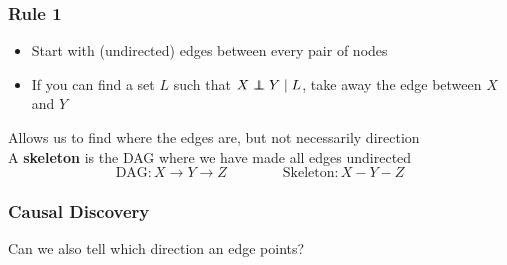 \documentclass{beamer}
\def\independenT#1#2{\mathrel{\rlap{$#1#2$}\mkern2mu{#1#2}}}
\newcommand\indep{\protect\mathpalette{\protect\independenT}{\perp}}
\begin{document}
\begin{frame}
\begin{columns}
\begin{column}{.5\textwidth}
    \end{column}
\end{columns}


\end{frame}

\begin{frame}
\frametitle{Rule 1}

{\large
\begin{itemize}
    \item Start with (undirected) edges between every pair of nodes
    \item If you can find a set $L$ such that $X \indep Y \mid L$, take away the edge between $X$ and $Y$
\end{itemize}
}

\pause
\vspace{2em}
Allows us to find where the edges are, but not necessarily direction \\
\pause
\vspace{2em}
A \textbf{skeleton} is the DAG where we have made all edges undirected
\[\text{DAG}: X \rightarrow Y \rightarrow Z \qquad \qquad \text{Skeleton}: X - Y - Z\]

\end{frame}

\begin{frame}
\frametitle{Causal Discovery}

\large
Can we also tell which direction an edge points?

\end{frame}
\end{document}
